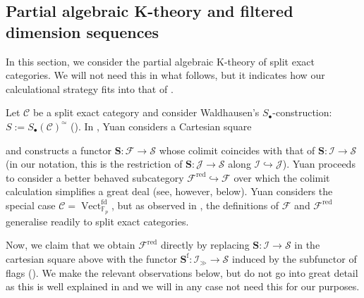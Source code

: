 \documentclass[12pt, reqno]{amsart}
\theoremstyle{plain}
\theoremstyle{definition}
\newcommand{\F}{\mathbb F}
\begin{document}
\subsection{Partial algebraic K-theory and filtered dimension sequences}

In this section, we consider the partial algebraic K-theory of split exact categories. We will not need this in what follows, but it indicates how our calculational strategy fits into that of \cite{Yuan}.

Let $\mathcal{C}$ be a split exact category and consider Waldhausen's $S_\bullet$-construction: $S:=S_\bullet(\mathcal{C})^{\simeq}$ (\cite{Waldhausen}). In \cite{Yuan}, Yuan considers a Cartesian square
\begin{center}
\end{center}
and constructs a functor $\mathbf{S}\colon \mathcal{F}\rightarrow \mathcal{S}$ whose colimit coincides with that of $\mathbf{S} \colon \mathcal{I}\rightarrow \mathcal{S}$ (in our notation, this is the restriction of $\mathbf{S}\colon \mathcal{J}\rightarrow \mathcal{S}$ along $\mathcal{I}\hookrightarrow \mathcal{J}$). Yuan proceeds to consider a better behaved subcategory $\mathcal{F}^{\operatorname{red}}\hookrightarrow \mathcal{F}$ over which the colimit calculation simplifies a great deal (see, however,  below). Yuan considers the special case $\mathcal{C}=\operatorname{Vect}_{\F_p}^{\operatorname{fd}}$, but as observed in \cite{Nardin}, the definitions of $\mathcal{F}$ and $\mathcal{F}^{\operatorname{red}}$ generalise readily to split exact categories.

Now, we claim that we obtain $\mathcal{F}^{\operatorname{red}}$ directly by replacing $\mathbf{S} \colon \mathcal{I}\rightarrow \mathcal{S}$ in the cartesian square above with the functor $\mathbf{S}^{\operatorname{f}} \colon \mathcal{I}_\gg\rightarrow \mathcal{S}$ induced by the subfunctor of flags (). We make the relevant observations below, but do not go into great detail as this is well explained in \cite{Yuan} and we will in any case not need this for our purposes.
\end{document}

